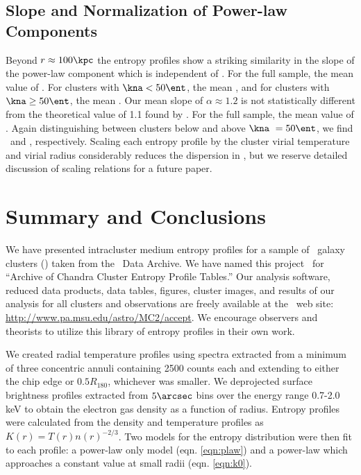 \documentclass[apj]{emulateapj}
\begin{document}
\subsection{Slope and Normalization of Power-law Components}
\label{sec:slopes}

Beyond $r \approx 100 \kpc$ the entropy profiles show a striking
similarity in the slope of the power-law component which is
independent of \kna. For the full sample, the mean value of \alphafs.
For clusters with $\kna < 50 \ent$, the mean \alphaga, and for
clusters with $\kna \geq 50 \ent$, the mean \alphagb. Our mean slope of
$\alpha \approx 1.2$ is not statistically different from the
theoretical value of 1.1 found by \citet{tozzi01}. For the full
sample, the mean value of \khunfs. Again distinguishing between
clusters below and above $\kna\ = 50 \ent$, we find \khunga\ and
\khungb, respectively. Scaling each entropy profile by the cluster
virial temperature and virial radius considerably reduces the
dispersion in \khun, but we reserve detailed discussion of scaling
relations for a future paper.

\section{Summary and Conclusions}
\label{sec:summary}

We have presented intracluster medium entropy profiles for a sample of
\numcluster\ galaxy clusters (\expt) taken from the \chandra\ Data
Archive. We have named this project \accept\ for ``Archive of Chandra
Cluster Entropy Profile Tables.'' Our analysis software, reduced data
products, data tables, figures, cluster images, and results of our
analysis for all clusters and observations are freely available at the
\accept\ web site: \url{http://www.pa.msu.edu/astro/MC2/accept}. We
encourage observers and theorists to utilize this library of entropy
profiles in their own work.

We created radial temperature profiles using spectra extracted from a
minimum of three concentric annuli containing 2500 counts each and
extending to either the chip edge or $0.5 R_{180}$, whichever was
smaller. We deprojected surface brightness profiles extracted from
$5\arcsec$ bins over the energy range 0.7-2.0 keV to obtain the
electron gas density as a function of radius. Entropy profiles were
calculated from the density and temperature profiles as $K(r) =
T(r)n(r)^{-2/3}$. Two models for the entropy distribution were then
fit to each profile: a power-law only model (eqn. \ref{eqn:plaw}) and
a power-law which approaches a constant value at small radii
(eqn. \ref{eqn:k0}).
\end{document}
